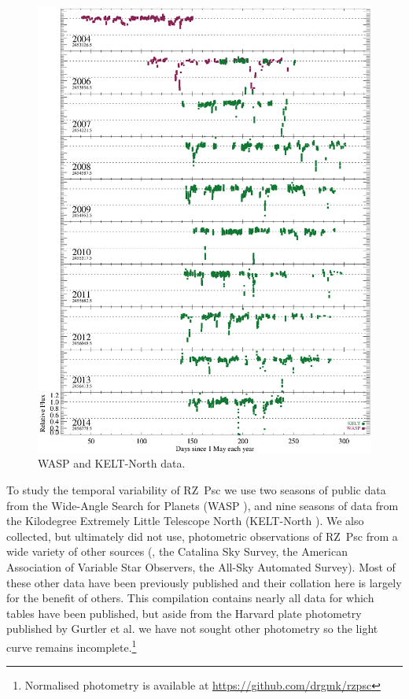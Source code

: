 \documentclass[]{rsos}
\begin{document}
\begin{figure}
  \begin{center}
    \hspace{-0.5cm} \includegraphics[width=\textwidth]{figs/yearly-2004.eps}
    \caption{WASP and KELT-North data.}\label{fig:waspkelt}
  \end{center}
\end{figure}

To study the temporal variability of RZ~Psc we use two seasons of public data from the
Wide-Angle Search for Planets (WASP \cite{2006PASP..118.1407P}), and nine seasons of data
from the Kilodegree Extremely Little Telescope North (KELT-North
\cite{2007PASP..119..923P}). We also collected, but ultimately did not use, photometric
observations of RZ~Psc from a wide variety of other sources
(\cite{1994AJ....108.1906H,1973IBVS..783....1K,1980PZ.....21..310K,1985PZ.....22..181Z,1991Afz....34..333K,1997AcA....47..467P,2014Ap.....57..491P},
the Catalina Sky Survey, the American Association of Variable Star Observers, the All-Sky
Automated Survey). Most of these other data have been previously published and their
collation here is largely for the benefit of others. This compilation contains nearly all
data for which tables have been published, but aside from the Harvard plate photometry
published by G\:urtler et al. \cite{1999A&AS..140..293G} we have not sought other
photometry so the light curve remains incomplete.\footnote{Normalised photometry is
  available at \href{https://github.com/drgmk/rzpsc}{https://github.com/drgmk/rzpsc}}
\end{document}
